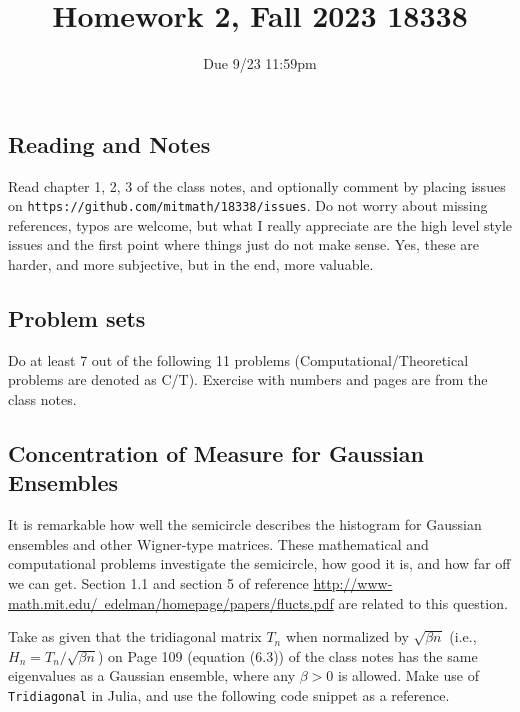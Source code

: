 \documentclass{article}
\title{Homework 2, Fall 2023 18338}
\author{Due 9/23 11:59pm}
\date{}
\begin{document}
\maketitle



\subsection*{Reading and Notes}
Read chapter 1, 2, 3 of the class notes, and optionally comment  by placing  issues on \verb+https://github.com/mitmath/18338/issues+.
Do not worry about missing references, typos are welcome, but what I really appreciate are
the high level style issues and the first point where things just do  not make sense.
Yes, these are harder, and more subjective, but in the end, more valuable.


\subsection*{Problem sets}
Do at least 7 out of the following 11 problems (Computational/Theoretical problems are denoted as C/T). Exercise with numbers and pages are from the class notes.

\subsection*{Concentration of Measure for Gaussian Ensembles}

It is remarkable how well the semicircle describes the histogram for Gaussian ensembles and other Wigner-type matrices. These mathematical and computational problems investigate the semicircle, how good it is, and how far off we can get. Section 1.1 and section 5 of reference \href{http://www-math.mit.edu/~edelman/homepage/papers/flucts.pdf}{http://www-math.mit.edu/~edelman/homepage/papers/flucts.pdf} are related to this question.

Take as given that the tridiagonal matrix $T_n$ when normalized by $\sqrt{\beta n}$ (i.e., $H_n = T_n/\sqrt{\beta n}$) on Page 109 (equation (6.3)) of the class notes has the same eigenvalues as a Gaussian ensemble, where any $\beta>0$ is allowed. Make use of \verb|Tridiagonal| in Julia, and use the following code snippet as a reference.
\end{document}
